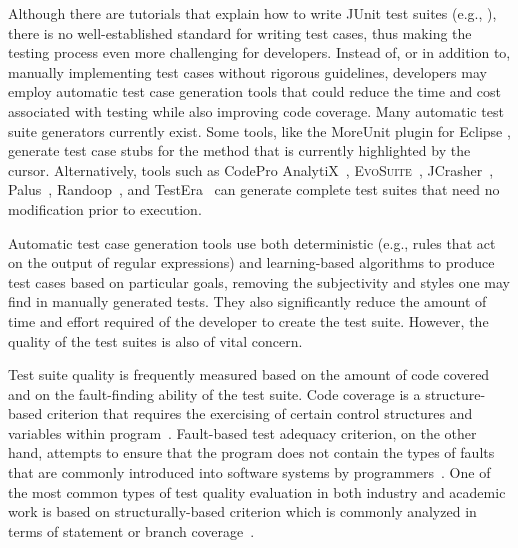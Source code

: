 

Although there are tutorials that explain how to write JUnit test suites (e.g., \cite{vogella2013}), there is no well-established standard for writing test cases, thus making the testing process even more challenging for developers.  Instead of, or in addition to, manually implementing test cases without rigorous guidelines, developers may employ automatic test case generation tools that could reduce the time and cost associated with testing while also improving code coverage.  Many automatic test suite generators currently exist.  Some tools, like the MoreUnit plugin for Eclipse \cite{moreunit}, generate test case stubs for the method that is currently highlighted by the cursor.  Alternatively, tools such as CodePro AnalytiX~\cite{codepro1}, \textsc{EvoSuite}~\cite{fraser:2011:eat:2025113.2025179}, JCrasher~\cite{csallner2004}, Palus~\cite{zhang:2011:pha:1985793.1986036}, Randoop~\cite{pacheco2007feedback}, and TestEra~\cite{marinov:2001:tnf:872023.872551} can generate complete test suites that need no modification prior to execution.




Automatic test case generation tools use both deterministic (e.g., rules that act on the output of regular expressions)
and learning-based algorithms to produce test cases based on particular goals, removing the subjectivity and styles one
may find in manually generated tests.  They also significantly reduce the amount of time and effort required of the
developer to create the test suite.  However, the quality of the test suites is also of vital concern.  

Test suite quality is frequently measured based on the amount of code covered and on the fault-finding ability of the
test suite.  Code coverage is a structure-based criterion that requires the exercising of certain control structures and
variables within program~\cite{kapfhammer-testing-handbook}. Fault-based test adequacy criterion, on the other hand,
attempts to ensure that the program does not contain the types of faults that are commonly introduced into software
systems by programmers~\cite{demillo1978hints, zhu1997software}.  One of the most common types of test quality
evaluation in both industry and academic work is based on structurally-based criterion which is commonly analyzed in
terms of statement or branch coverage~\cite{weyuker1988evaluation}.

